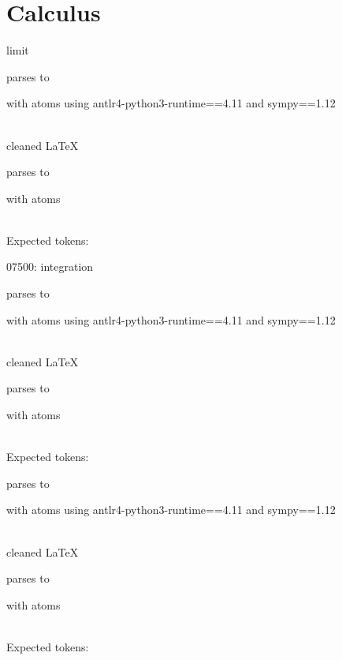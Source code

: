 \documentclass{article}
\begin{document}
\hrulefill


\section{Calculus}
limit

parses to

with atoms
using antlr4-python3-runtime==4.11 and sympy==1.12

\ \\
cleaned \LaTeX

parses to

with atoms


\ \\
Expected tokens:



\hrulefill

07500:
integration

parses to

with atoms
using antlr4-python3-runtime==4.11 and sympy==1.12

\ \\
cleaned \LaTeX

parses to

with atoms


\ \\
Expected tokens:



\hrulefill



parses to

with atoms
using antlr4-python3-runtime==4.11 and sympy==1.12

\ \\
cleaned \LaTeX

parses to

with atoms


\ \\
Expected tokens:

\end{document}
